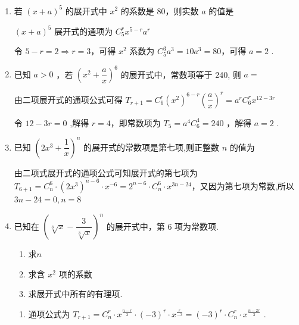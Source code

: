 \begin{enumerate}
\begin{enumerate}
        \item 若 ${\left( x + a\right) }^{5}$ 的展开式中 ${x}^{2}$ 的系数是 80，则实数 $a$ 的值是
        \begin{jieda}
            ${\left( x + a\right) }^{5}$ 展开式的通项为 ${{C}}_{5}^{r}{x}^{5 - r}{a}^{r}$

            令 $5 - r = 2 \Longrightarrow  r = 3$，可得 ${x}^{2}$ 系数为 ${{C}}_{5}^{3}{a}^{3} = {10}{a}^{3} = {80}$，可得 $a = 2$ .
        \end{jieda}
        
        \item 已知 $a > 0$ ，若 ${\left( {x}^{2} + \dfrac{a}{x}\right) }^{6}$ 的展开式中，常数项等于 240, 则 $a =$
        \begin{jieda}
            由二项展开式的通项公式可得 ${T}_{r + 1} = {{C}}_{6}^{r}{\left( {x}^{2}\right) }^{6 - r}{\left( \dfrac{a}{x}\right) }^{r} = {a}^{r}{{C}}_{6}^{r}{x}^{{12} - {3r}}$
            
            令 ${12} - {3r} = 0$ ,解得 $r = 4$，即常数项为 ${T}_{5} = {a}^{4}{{C}}_{6}^{4} = {240}$ ，解得 $a = 2$ .
        \end{jieda}
        \item 已知 ${\left( 2{x}^{3} + \dfrac{1}{x}\right) }^{n}$ 的展开式的常数项是第七项,则正整数 $n$ 的值为
        \begin{jieda}
            由二项式展开式的通项公式可知展开式的第七项为 ${T}_{6 + 1} = {{C}}_{n}^{6} \cdot  {\left( 2{x}^{3}\right) }^{n - 6} \cdot  {x}^{-6} = {2}^{n - 6} \cdot  {{C}}_{n}^{6} \cdot  {x}^{{3n} - {24}}$，又因为第七项为常数,所以 ${3n} - {24} = 0,n = 8$
        \end{jieda}
        \item 已知在 ${\left( \sqrt[3]{x} - \dfrac{3}{\sqrt[3]{x}}\right) }^{n}$ 的展开式中，第 6 项为常数项.
        \begin{enumerate}
            \item 求$n$
            \item 求含 $x^{2}$ 项的系数
            \item 求展开式中所有的有理项.
        \end{enumerate}
        \begin{jieda}
            \begin{enumerate}
                \item 通项公式为 ${T}_{r + 1} = {C}_{n}^{r} \cdot  {x}^{\frac{n - r}{3}} \cdot  {\left( -3\right) }^{r} \cdot  {x}^{\frac{r}{-3}} = {\left( -3\right) }^{r} \cdot  {C}_{n}^{r} \cdot  {x}^{\frac{n - {2r}}{3}}$ .
                

\end{enumerate}
\end{jieda}
\end{enumerate}
\end{enumerate}
